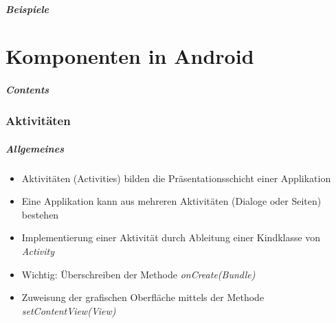 \begin{frame}[label=resources]
   \frametitle{Beispiele}

   
   
   
\end{frame}

\part{Komponenten in Android}
\frame{\partpage}
\begin{frame}
	\frametitle{Contents}
	\tableofcontents[]
\end{frame}

\section{Aktivitäten}
\begin{frame}[label=activities]
   \frametitle{Allgemeines}
   \begin{itemize}
      \item Aktivitäten (Activities) bilden die Präsentationsschicht einer Applikation
      \item Eine Applikation kann aus mehreren Aktivitäten (Dialoge oder Seiten) bestehen
      \item Implementierung einer Aktivität durch Ableitung einer Kindklasse von \emph{Activity}
      \item Wichtig: Überschreiben der Methode \emph{onCreate(Bundle)}
      \item Zuweisung der grafischen Oberfläche mittels der Methode \emph{setContentView(View)}
   \end{itemize}

   
\end{frame}

